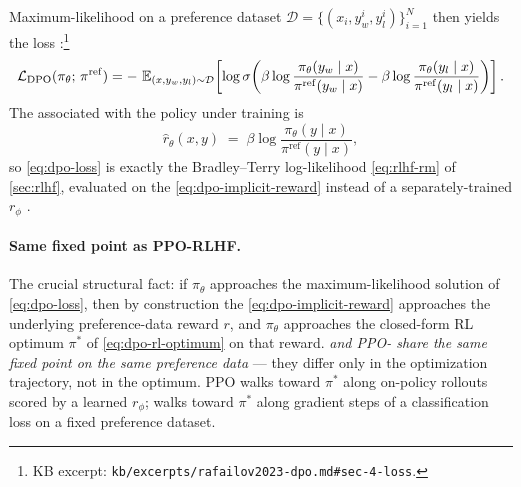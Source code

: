 Maximum-likelihood on a preference dataset
$\mathcal{D} = \{(x_i, y_w^i, y_l^i)\}_{i=1}^N$ then yields the 
loss \citep[\S 4, Eq.~7]{rafailov2023-dpo}:\footnote{KB excerpt:
\nolinkurl{kb/excerpts/rafailov2023-dpo.md#sec-4-loss}.}
\begin{equation}
\mathcal{L}_{\mathrm{DPO}}(\pi_\theta;\, \pi^{\mathrm{ref}})
  = -\, \operatorname{\mathbb{E}}_{(x, y_w, y_l) \sim \mathcal{D}}
      \!\left[
        \log \sigma\!\left(
          \beta \log \frac{\pi_\theta(y_w \mid x)}{\pi^{\mathrm{ref}}(y_w \mid x)}
          - \beta \log \frac{\pi_\theta(y_l \mid x)}{\pi^{\mathrm{ref}}(y_l \mid x)}
        \right)
      \right].
\label{eq:dpo-loss}
\end{equation}
The  associated with the policy under training is
\begin{equation}
\hat{r}_\theta(x, y)
  \;=\; \beta \log \frac{\pi_\theta(y \mid x)}{\pi^{\mathrm{ref}}(y \mid x)},
\label{eq:dpo-implicit-reward}
\end{equation}
so \cref{eq:dpo-loss} is exactly the Bradley--Terry log-likelihood
\cref{eq:rlhf-rm} of \cref{sec:rlhf}, evaluated on the 
\cref{eq:dpo-implicit-reward} instead of a separately-trained
$r_\phi$ \citep[\S 4]{rafailov2023-dpo}.

\paragraph{Same fixed point as PPO-RLHF.} The crucial structural fact:
if $\pi_\theta$ approaches the maximum-likelihood solution of
\cref{eq:dpo-loss}, then by construction the 
\cref{eq:dpo-implicit-reward} approaches the underlying preference-data
reward $r$, and $\pi_\theta$ approaches the closed-form RL optimum
$\pi^*$ of \cref{eq:dpo-rl-optimum} on that reward. \emph{ and
PPO- share the same fixed point on the same preference data}
\citep[\S 4]{rafailov2023-dpo} --- they differ only in the optimization
trajectory, not in the optimum. PPO walks toward $\pi^*$ along on-policy
rollouts scored by a learned $r_\phi$;  walks toward $\pi^*$ along
gradient steps of a classification loss on a fixed preference dataset.

